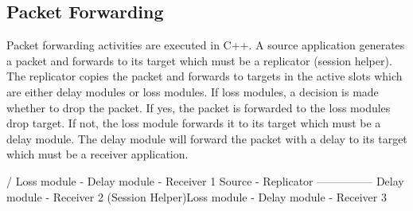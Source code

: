 \subsection{Packet Forwarding}
\label{sec:session-pktforward}
Packet forwarding activities are executed in C++.  A source application 
generates a packet and forwards to its target which must be a replicator 
(session helper).  The replicator copies the packet and forwards 
to targets in the active slots which are either delay modules or loss modules. If loss modules, a decision is made whether to drop the packet.
If yes, the packet is forwarded to the loss modules drop target.  If not,
the loss module forwards it to its target which must be a delay module.
The delay module will forward the packet with a delay to its target which
must be a receiver application.


\begin{program}
                    / Loss module - Delay module - Receiver 1
Source - Replicator --------------- Delay module - Receiver 2
    (Session Helper)\bs Loss module - Delay module - Receiver 3

\end{program}

\endinput

### Local Variables:
### mode: latex
### comment-column: 60
### backup-by-copying-when-linked: t
### file-precious-flag: nil
### End:
